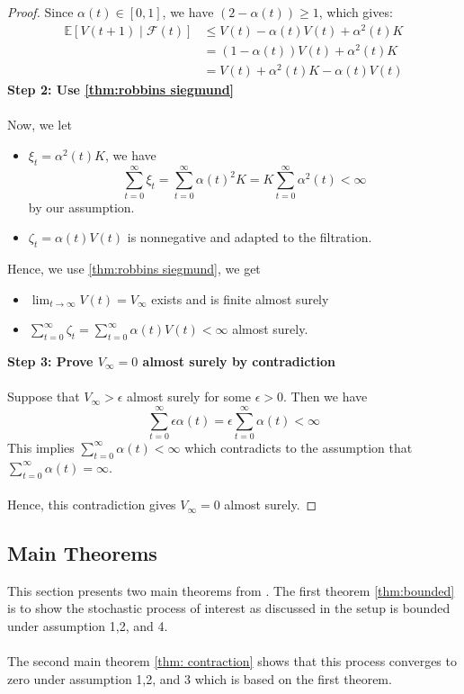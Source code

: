 \begin{proof}
\noindent Since $\alpha(t) \in [0,1]$, we have $(2 - \alpha(t)) \geq 1$, which gives:
\begin{align*}
\mathbb{E}[V(t+1) \mid \mathcal{F}(t)] &\leq V(t) - \alpha(t)V(t) + \alpha^2(t)K \\
&= (1 - \alpha(t))V(t) + \alpha^2(t)K\\
&= V(t) + \alpha^2(t) K -\alpha(t) V(t)
\end{align*}
\textbf{Step 2: Use \autoref{thm:robbins siegmund}}\\
\\
\noindent Now, we let
\begin{itemize}
    \item $\xi_t = \alpha^2(t)K$, we have 
    $$
    \sum_{t=0}^\infty \xi_t  = \sum_{t=0}^\infty \alpha(t)^2K = K\sum_{t=0}^\infty \alpha^2(t) <\infty
    $$
    by our assumption. 
    \item $\zeta_t = \alpha(t)V(t)$ is nonnegative and adapted to the filtration. 
\end{itemize}
Hence, we use \autoref{thm:robbins siegmund}, we get
\begin{itemize}
    \item $\lim_{t\to\infty} V(t) = V_\infty$ exists and is finite almost surely
    \item $\sum_{t=0}^\infty \zeta_t = \sum_{t=0}^\infty \alpha(t) V(t)<\infty$ almost surely.
\end{itemize}
\textbf{Step 3: Prove $V_\infty =0$ almost surely by contradiction}\\
\\
Suppose that $V_\infty>\epsilon$ almost surely for some $\epsilon>0$. Then we have
$$
\sum_{t=0}^\infty \epsilon \alpha(t) =\epsilon\sum_{t=0}^\infty \alpha(t) <\infty
$$
This implies $\sum_{t=0}^\infty \alpha(t)<\infty$ which contradicts to the assumption that $\sum_{t=0}^\infty \alpha(t) = \infty$.\\
\\
Hence, this contradiction gives $V_\infty =0$ almost surely.
\end{proof}
\newpage

\subsection{Main Theorems}
This section presents two main theorems from \cite{tsitsiklis1994asynchronous}. The first theorem \autoref{thm:bounded} is to show the stochastic process of interest as discussed in the setup is bounded under assumption 1,2, and 4.\\
\\
The second main theorem \autoref{thm: contraction} shows that this process converges to zero under assumption 1,2, and 3 which is based on the first theorem.
